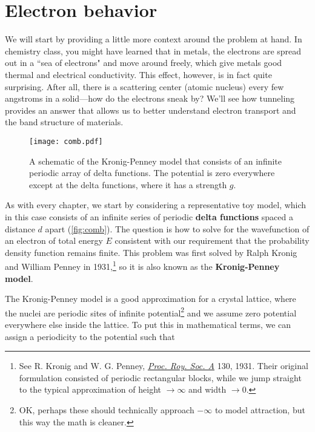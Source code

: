 \section{Electron behavior}

We will start by providing a little more context around the problem at hand. 
In chemistry class, you might have learned that in metals, the electrons are spread out in a ``sea of electrons" and move around freely, which give metals good thermal and electrical conductivity. 
This effect, however, is in fact quite surprising. 
After all, there is a scattering center (atomic nucleus) every few angstroms in a solid---how do the electrons sneak by? 
We'll see how tunneling provides an answer that allows us to better understand electron transport and the band structure of materials. 

\begin{figure}[!h]
	\centering
	\texttt{[image: comb.pdf]}
	\caption{A schematic of the Kronig-Penney model that consists of an infinite periodic array of delta functions. 
	The potential is zero everywhere except at the delta functions, where it has a strength $g$.}
	\label{fig:comb}
\end{figure}

As with every chapter, we start by considering a representative toy model, which in this case consists of an infinite series of periodic \textbf{delta functions} spaced a distance $d$ apart (\autoref{fig:comb}). 
The question is how to solve for the wavefunction of an electron of total energy $E$ consistent with our requirement that the probability density function remains finite. 
This problem was first solved by Ralph Kronig and William Penney in 1931,\footnote{See R. Kronig and W. G. Penney, \href{http://rspa.royalsocietypublishing.org/content/130/814/499}{\emph{Proc. Roy. Soc. A}} 130, 1931. Their original formulation consisted of periodic rectangular blocks, while we jump straight to the typical approximation of height $\rightarrow\infty$ and width $\rightarrow0$.} so it is also known as the \textbf{Kronig-Penney model}.

The Kronig-Penney model is a good approximation for a crystal lattice, where the nuclei are periodic sites of infinite potential\footnote{OK, perhaps these should technically approach $-\infty$ to model attraction, but this way the math is cleaner.} and we assume zero potential everywhere else inside the lattice. 
To put this in mathematical terms, we can assign a periodicity to the potential such that 


